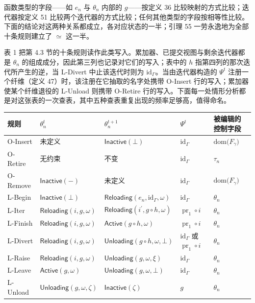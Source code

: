 \documentclass[
  10
]{article}
\newcounter{none} %
\begin{document}
函数类型的字段——如 $e _ { n }$ 与 $\theta _ { n }$ 内部的 $g$——按定义 36 比较映射的方式比较；迭代器按定义 51 比较两个迭代器的方式比较；任何其他类型的字段按相等性比较。下面的结论对这两种关系都成立，各对应状态的一半；引理 55 一劳永逸地为全部十条规则建立了 $\simeq$ 这一半。

表 1 把第 4.3 节的十条规则读作此类写入。累加器、已提交视图与剩余迭代器都是 $\theta _ { n }$ 的组成成分，因此第三列也记录对它们的写入；表中的 $h$ 指第四列的那次迭代所产生的逆，当 L-Divert 中止该迭代时则为 $\mathrm { i d } _ { \Gamma }$。当由迭代器构造的 $\Psi ^ { t }$ 注册一个纤维（定义 47）时，该注册在它抽取的名字处携带 O-Insert 行的写入；累加器使某个纤维退役的 L-Unload 则携带 O-Retire 行的写入。下面每一处情形分析都是对这张表的一次查表，其中五种查表重复出现的频率足够高，值得命名。

{\def\LTcaptype{none} %
\begin{longtable}[]{@{}|l|l|l|l|l|@{}}
\toprule\noalign{}
\endhead
\bottomrule\noalign{}
\endlastfoot
\hline
规则 & $\theta _ { n } ^ { t }$ & $\theta _ { n } ^ { t + 1 }$ & $\Psi ^ { t }$ & 被编辑的控制字段 \\
\hline
O-Insert & 未定义 & $\mathsf{Inactive}(\bot)$ & $\mathrm { i d } _ { \Gamma }$ & $\mathrm { d o m } \big ( F _ { \gamma } \big )$ \\
\hline
O-Retire & 无约束 & 不变 & $\mathrm { i d } _ { \Gamma }$ & $\tau _ { n }$ \\
\hline
O-Remove & $\mathsf{Inactive}(-)$ & 未定义 & $\mathrm { i d } _ { \Gamma }$ & $\mathrm { d o m } \big ( F _ { \gamma } \big )$ \\
\hline
L-Begin & $\mathsf{Inactive}(\bot)$ & $\mathsf{Reloading}(e _ { n } , \mathrm { i d } _ { \Gamma } , \omega)$ & $\mathrm { i d } _ { \Gamma }$ & $\theta _ { n }$ \\
\hline
L-Iter & $\mathsf{Reloading}(i , g , \omega)$ & $\mathsf{Reloading}(i ^ { \prime } , g \circ h , \omega)$ & $\operatorname { p r } _ { 1 } \circ i$ & $\theta _ { n }$ \\
\hline
L-Finish & $\mathsf{Reloading}(i , g , \omega)$ & $\mathsf{Active}(g \circ h , \omega)$ & $\operatorname { p r } _ { 1 } \circ i$ & $\theta _ { n }$ \\
\hline
L-Divert & $\mathsf{Reloading}(i , g , \omega)$ & $\mathsf{Unloading}(g \circ h , \omega , \bot)$ & $\mathrm { i d } _ { \Gamma }$ 或 $\operatorname { p r } _ { 1 } \circ i$ & $\theta _ { n }$ \\
\hline
L-Raise & $\mathsf{Reloading}(i , g , \omega)$ & $\mathsf{Unloading}(g , \omega , \xi)$ & $\mathrm { i d } _ { \Gamma }$ & $\theta _ { n }$ \\
\hline
L-Leave & $\mathsf{Active}(g , \omega)$ & $\mathsf{Unloading}(g , \omega , \bot)$ & $\mathrm { i d } _ { \Gamma }$ & $\theta _ { n }$ \\
\hline
L-Unload & $\mathsf{Unloading}(g , \omega , \zeta)$ & $\mathsf{Inactive}(\zeta)$ & $g$ & $\theta _ { n }$ \\
\hline
\end{longtable}
}
\end{document}
